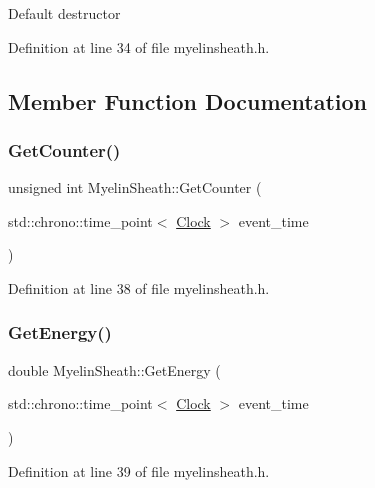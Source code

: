 Default destructor 

Definition at line 34 of file myelinsheath.\+h.



\subsection{Member Function Documentation}
\mbox{\label{class_myelin_sheath_a10eef8601d129e7e2f28e8ed1ebc975c}} 
\subsubsection{\texorpdfstring{Get\+Counter()}{GetCounter()}}
{\footnotesize\ttfamily unsigned int Myelin\+Sheath\+::\+Get\+Counter (\begin{DoxyParamCaption}\item[{std\+::chrono\+::time\+\_\+point$<$ \mbox{\hyperlink{universe_8h_a0ef8d951d1ca5ab3cfaf7ab4c7a6fd80}{Clock}} $>$}]{event\+\_\+time }\end{DoxyParamCaption})\hspace{0.3cm}{\ttfamily [inline]}}



Definition at line 38 of file myelinsheath.\+h.

\mbox{\label{class_myelin_sheath_ac0c4142b6066e5982c54583e8ac01271}} 
\subsubsection{\texorpdfstring{Get\+Energy()}{GetEnergy()}}
{\footnotesize\ttfamily double Myelin\+Sheath\+::\+Get\+Energy (\begin{DoxyParamCaption}\item[{std\+::chrono\+::time\+\_\+point$<$ \mbox{\hyperlink{universe_8h_a0ef8d951d1ca5ab3cfaf7ab4c7a6fd80}{Clock}} $>$}]{event\+\_\+time }\end{DoxyParamCaption})\hspace{0.3cm}{\ttfamily [inline]}}



Definition at line 39 of file myelinsheath.\+h.

